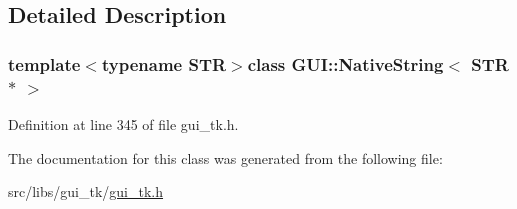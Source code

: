 \subsection{Detailed Description}
\subsubsection*{template$<$typename S\-T\-R$>$class G\-U\-I\-::\-Native\-String$<$ S\-T\-R $\ast$ $>$}



Definition at line 345 of file gui\-\_\-tk.\-h.



The documentation for this class was generated from the following file\-:\begin{DoxyCompactItemize}
\item 
src/libs/gui\-\_\-tk/\hyperlink{gui__tk_8h}{gui\-\_\-tk.\-h}\end{DoxyCompactItemize}
